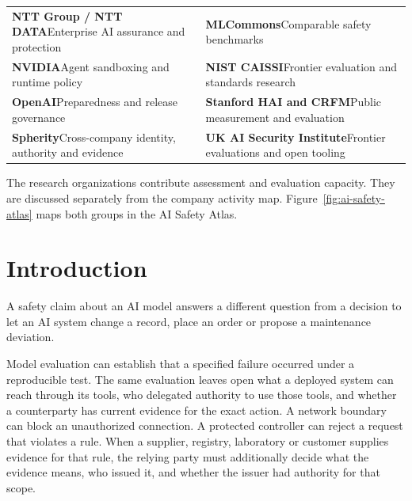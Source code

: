 \begin{table}[!htbp]
\begin{tabularx}{\linewidth}{@{}>{\RaggedRight\arraybackslash}X>{\RaggedRight\arraybackslash}X@{}}
\textbf{NTT Group / NTT DATA}\newline Enterprise AI assurance and protection & \textbf{MLCommons}\newline Comparable safety benchmarks \\[0.35em]
\textbf{NVIDIA}\newline Agent sandboxing and runtime policy & \textbf{NIST CAISSI}\newline Frontier evaluation and standards research \\[0.35em]
\textbf{OpenAI}\newline Preparedness and release governance & \textbf{Stanford HAI and CRFM}\newline Public measurement and evaluation \\[0.35em]
\textbf{Spherity}\newline Cross-company identity, authority and evidence & \textbf{UK AI Security Institute}\newline Frontier evaluations and open tooling \\
\bottomrule
\end{tabularx}
\end{table}

The research organizations contribute assessment and evaluation capacity. They are discussed separately from the company activity map. Figure~\ref{fig:ai-safety-atlas} maps both groups in the AI Safety Atlas.

\FloatBarrier

\section{Introduction}
\label{sec:introduction}

A safety claim about an AI model answers a different question from a decision to let an AI system change a record, place an order or propose a maintenance deviation.

Model evaluation can establish that a specified failure occurred under a reproducible test. The same evaluation leaves open what a deployed system can reach through its tools, who delegated authority to use those tools, and whether a counterparty has current evidence for the exact action. A network boundary can block an unauthorized connection. A protected controller can reject a request that violates a rule. When a supplier, registry, laboratory or customer supplies evidence for that rule, the relying party must additionally decide what the evidence means, who issued it, and whether the issuer had authority for that scope.~\cite{src1,src2,src3}

